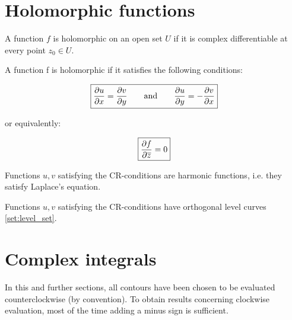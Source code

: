 \section{Holomorphic functions}
        \begin{definition}[Holomorphic]
            A function $f$ is holomorphic on an open set $U$ if it is complex differentiable at every point $z_0\in U$. 
        \end{definition}
        
        \begin{theorem}
            A function f is holomorphic if it satisfies the following conditions:

            \begin{equation}
                \label{complexcalculus:cauchy_riemann}
                \boxed{\frac{\partial u}{\partial x} = \frac{\partial v}{\partial y} \text{\qquad and\qquad} \frac{\partial u}{\partial y} = -\frac{\partial v}{\partial x}}
            \end{equation}

            \noindent or equivalently:

            \begin{equation}
                \label{complexcalculus:holomorphic_alternative_condition}
                \boxed{\frac{\partial f}{\partial \overline{z}} = 0}
            \end{equation}
        \end{theorem}

	\begin{property}
		Functions $u,v$ satisfying the CR-conditions are harmonic functions, i.e. they satisfy Laplace's equation.
	\end{property}
    \begin{property}
		Functions $u,v$ satisfying the CR-conditions have orthogonal level curves \ref{set:level_set}.
	\end{property}

\section{Complex integrals}
		In this and further sections, all contours have been chosen to be evaluated counterclockwise (by convention). To obtain results concerning clockwise evaluation, most of the time adding a minus sign is sufficient.
        
